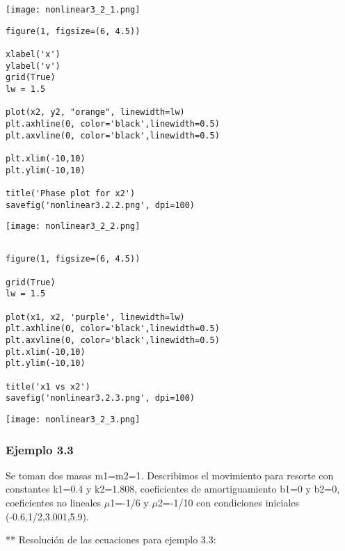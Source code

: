 \documentclass{article} %
\begin{document}
\begin{center}
	\texttt{[image: nonlinear3\_2\_1.png]}
\end{center}


\begin{verbatim} 
figure(1, figsize=(6, 4.5))

xlabel('x')
ylabel('v')
grid(True)
lw = 1.5

plot(x2, y2, "orange", linewidth=lw)
plt.axhline(0, color='black',linewidth=0.5)
plt.axvline(0, color='black',linewidth=0.5)

plt.xlim(-10,10)
plt.ylim(-10,10)

title('Phase plot for x2')
savefig('nonlinear3.2.2.png', dpi=100)

\end{verbatim}


\begin{center}
	\texttt{[image: nonlinear3\_2\_2.png]}
\end{center}



\begin{verbatim} 

figure(1, figsize=(6, 4.5))

grid(True)
lw = 1.5

plot(x1, x2, 'purple', linewidth=lw)
plt.axhline(0, color='black',linewidth=0.5)
plt.axvline(0, color='black',linewidth=0.5)
plt.xlim(-10,10)
plt.ylim(-10,10)

title('x1 vs x2')
savefig('nonlinear3.2.3.png', dpi=100)

\end{verbatim}


\begin{center}
	\texttt{[image: nonlinear3\_2\_3.png]}
\end{center}



\subsubsection{Ejemplo 3.3}

Se toman dos masas m1=m2=1. Describimos el movimiento para resorte con constantes k1=0.4 y k2=1.808, coeficientes de amortiguamiento b1=0 y b2=0, coeficientes no lineales $\mu$1=-1/6 y $\mu$2=-1/10 con condiciones iniciales (-0.6,1/2,3.001,5.9).

\vspace{0.5 cm}

** Resolución de las ecuaciones para ejemplo 3.3:
\end{document}
